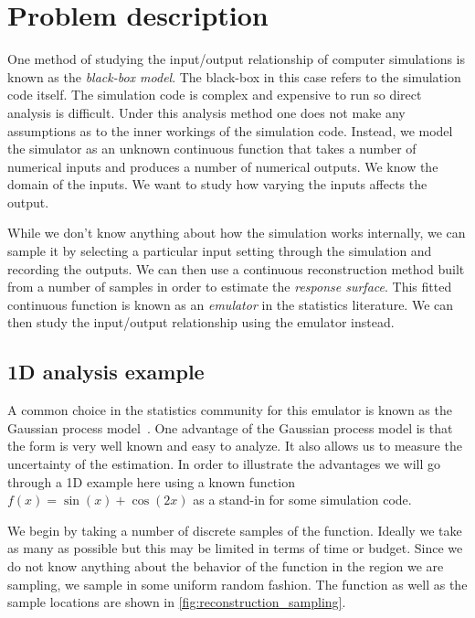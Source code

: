 
\section{Problem description}

One method of studying the input/output relationship of computer simulations 
is known as the 
\emph{black-box model}. 
The black-box in this case refers to the simulation code itself.
The simulation code is complex and expensive to run
so direct analysis is difficult.
Under this analysis method one does not make any assumptions as to the
inner workings of the simulation code.  Instead, we model the simulator as an
unknown continuous function
that takes a number
of numerical inputs and produces a number of numerical outputs.  We know
the domain of the inputs.  We want to study how varying the inputs
affects the output. 

While we don't know anything about how the simulation works internally, we can  
sample it by selecting a particular input setting through the simulation 
and recording the outputs.  We can then use a continuous reconstruction
method built from a number of samples in order to estimate the 
\emph{response surface}.
This fitted continuous function
is known as an \emph{emulator} in the
statistics literature.  We can then study the input/output relationship
using the emulator instead.  

\subsection{1D analysis example}
\label{sec:1d_example}

A common choice in the statistics community for this emulator is known as the
Gaussian process model~\cite{Rasmussen:2006}.  
One advantage of the Gaussian process model is that the form is very well
known and easy to analyze.  
It also allows us to measure the uncertainty of the estimation.
In order to illustrate the 
advantages we will go through a 1D example here using a known function
$f(x) = \sin(x) + \cos(2x)$
as a stand-in for some simulation code.

We begin by taking a number of discrete samples of the function.  Ideally
we take as many as possible but this may be limited in terms of time or
budget.  Since we do not know anything about the behavior of the function 
in the region we are sampling,
we sample in some uniform random fashion.
The function as well as the sample locations are shown in 
\autoref{fig:reconstruction_sampling}.

